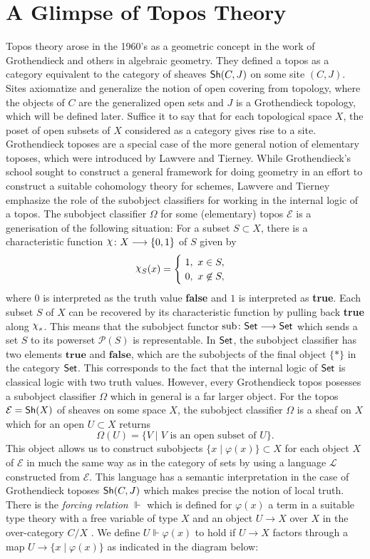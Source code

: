\section{A Glimpse of Topos Theory}
Topos theory arose in the 1960's as a geometric concept in the work of Grothendieck and others in algebraic geometry. They defined a topos as a category equivalent to the category of sheaves $\operatorname{\mathsf{Sh}}(C,J)$ on some site $(C,J)$. Sites axiomatize and generalize the notion of open covering from topology, where the objects of $C$ are the generalized open sets and $J$ is a Grothendieck topology, which will be defined later. Suffice it to say that for each topological space $X$, the poset of open subsets of $X$ considered as a category gives rise to a site. Grothendieck toposes are a special case of the more general notion of elementary toposes, which were introduced by Lawvere and Tierney. While Grothendieck's school sought to construct a general framework for doing geometry in an effort to construct a suitable cohomology theory for schemes, Lawvere and Tierney emphasize the role of the subobject classifiers for working in the internal logic of a topos. The subobject classifier $\Omega$ for some (elementary) topos $\mathcal{E}$ is a generisation of the following situation:
For a subset $S \subset X$, there is a characteristic function $\char \colon X \to \{0, 1\}$ of $S$ given by
\[ \char_S(x) =
	\begin{cases}
		\ 1,\ x \in S, \\
		\ 0,\ x \not \in S,
	\end{cases}
\]
where $0$ is interpreted as the truth value \textbf{false} and $1$ is interpreted as \textbf{true}. Each subset $S$ of $X$ can be recovered by its characteristic function by pulling back \textbf{true} along $\char_s$. This means that the subobject functor $\text{sub} \colon \mathsf{Set} \longrightarrow \mathsf{Set}$ which sends a set $S$  to its powerset $\mathcal{P}(S)$ is representable. In $\mathsf{Set}$, the subobject classifier has two elements $\mathbf{true}$ and $\mathbf{false}$, which are the subobjects of the final object $\{*\}$ in the category $\mathsf{Set}$. This corresponds to the fact that the internal logic of $\mathsf{Set}$ is classical logic with two truth values. However, every Grothendieck topos posesses a subobject classifier $\Omega$ which in general is a far larger object. For the topos $\mathcal{E} = \operatorname{\mathsf{Sh}}(X)$ of sheaves on some  space $X$, the subobject classifier $\Omega$ is a sheaf on $X$which for an open $U \subset X$ returns
\[
	\Omega(U) = \{ V \mid V \text{ is an open subset of }U\}.
\]
This object allows us to construct subobjects $\{x \mid \varphi(x)\} \subset X$ for each object $X$ of $\mathcal{E}$ in much the same way as in the category of sets by using a language $\mathcal{L}$ constructed from $\mathcal{E}$. This language has a semantic interpretation in the case of Grothendieck toposes $\operatorname{\mathsf{Sh}}(C,J)$ which makes precise the notion of local truth. There is the \textit{forcing relation} $\Vdash$ which is defined for $\varphi(x)$ a term in a suitable type theory with a free variable of type $X$ and an object $U \to X$ over $X$ in the over-category $C/X$ . We define $U \Vdash \varphi(x)$ to hold if $U \to X$ factors through a map $U \to \{x \mid \varphi(x)\}$ as indicated in the diagram below:

